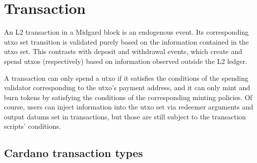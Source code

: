 \documentclass[../midgard.tex]{subfiles}
\begin{document}
\section{Transaction}
\label{h:transaction}

An L2 transaction in a Midgard block is an endogenous event.
Its corresponding utxo set transition is validated purely based on the information contained in the utxo set.
This contrasts with deposit and withdrawal events, which create and spend utxos (respectively) based on information observed outside the L2 ledger.

A transaction can only spend a utxo if it satisfies the conditions of the spending validator corresponding to the utxo's payment address, and it can only mint and burn tokens by satisfying the conditions of the corresponding minting policies.
Of course, users can inject information into the utxo set via redeemer arguments and output datums set in transactions, but those are still subject to the transaction scripts' conditions.

\subsection{Cardano transaction types}
\label{h:cardano-transaction-types}
\end{document}
